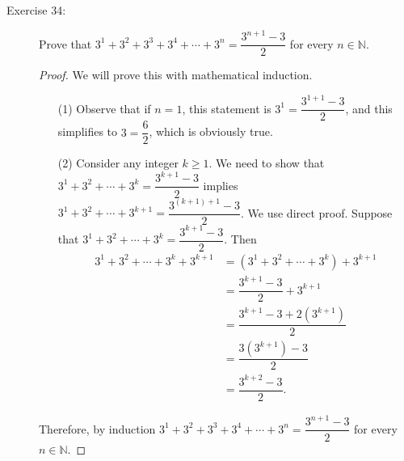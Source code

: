 \documentclass[12pt]{article}
\begin{document}
\begin{description}
\begin{spacing}{2}
\end{spacing}
\item[Exercise 34:] Prove that $3^1 + 3^2 + 3^3 + 3^4 + \cdots + 3^n = \dfrac{3^{n+1}-3}{2}$ for every $n \in \mathbb{N}$.
\begin{spacing}{2}
\begin{proof}
We will prove this with mathematical induction.
\begin{enumerate}
    \item[(1)] Observe that if $n=1$, this statement is $3^1 = \dfrac{3^{1+1}-3}{2}$, and this simplifies to $3 = \dfrac{6}{2}$, which is obviously true.
    \item[(2)] Consider any integer $k \geq 1$. We need to show that $3^1 + 3^2 + \cdots + 3^k = \dfrac{3^{k+1}-3}{2}$ implies $3^1 + 3^2 + \cdots + 3^{k+1} = \dfrac{3^{(k+1)+1}-3}{2}$. We use direct proof. Suppose that $3^1 + 3^2 + \cdots + 3^k = \dfrac{3^{k+1}-3}{2}$. Then
    \begin{align*}
    3^1 + 3^2 + \cdots + 3^k + 3^{k+1} &= (3^1 + 3^2 + \cdots + 3^k) + 3^{k+1} \\
    &= \dfrac{3^{k+1}-3}{2} + 3^{k+1} \\
    &= \dfrac{3^{k+1}-3 + 2(3^{k+1})}{2} \\
    &= \dfrac{3(3^{k+1})-3}{2} \\
    &= \dfrac{3^{k+2}-3}{2}.
    \end{align*}
    \end{enumerate}
Therefore, by induction $3^1 + 3^2 + 3^3 + 3^4 + \cdots + 3^n = \dfrac{3^{n+1}-3}{2}$ for every $n \in \mathbb{N}$.
\end{proof}
\end{spacing} 
\end{description}
%
\newpage
{}
%
\end{document}
